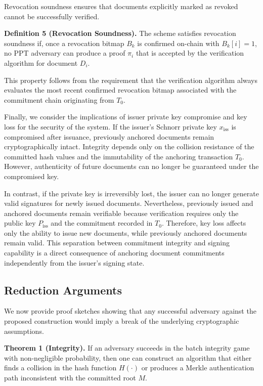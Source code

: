 \documentclass{IEEEoj}
\begin{document}
Revocation soundness ensures that documents explicitly marked as revoked cannot be successfully verified.

\textbf{Definition 5 (Revocation Soundness).}  
The scheme satisfies revocation soundness if, once a revocation bitmap $B_k$ is confirmed on-chain with $B_k[i] = 1$, no PPT adversary can produce a proof $\pi_i$ that is accepted by the verification algorithm for document $D_i$.

This property follows from the requirement that the verification algorithm always evaluates the most recent confirmed revocation bitmap associated with the commitment chain originating from $T_0$.

Finally, we consider the implications of issuer private key compromise and key loss for the security of the system. If the issuer's Schnorr private key $x_{\mathrm{iss}}$ is compromised after issuance, previously anchored documents remain cryptographically intact. Integrity depends only on the collision resistance of the committed hash values and the immutability of the anchoring transaction $T_0$. However, authenticity of future documents can no longer be guaranteed under the compromised key.

In contrast, if the private key is irreversibly lost, the issuer can no longer generate valid signatures for newly issued documents. Nevertheless, previously issued and anchored documents remain verifiable because verification requires only the public key $P_{\mathrm{iss}}$ and the commitment recorded in $T_0$. Therefore, key loss affects only the ability to issue new documents, while previously anchored documents remain valid. This separation between commitment integrity and signing capability is a direct consequence of anchoring document commitments independently from the issuer's signing state.

\subsection{Reduction Arguments}

We now provide proof sketches showing that any successful adversary against the proposed construction would imply a break of the underlying cryptographic assumptions.

\textbf{Theorem 1 (Integrity).}  
If an adversary succeeds in the batch integrity game with non-negligible probability, then one can construct an algorithm that either finds a collision in the hash function $H(\cdot)$ or produces a Merkle authentication path inconsistent with the committed root $M$.
\end{document}

